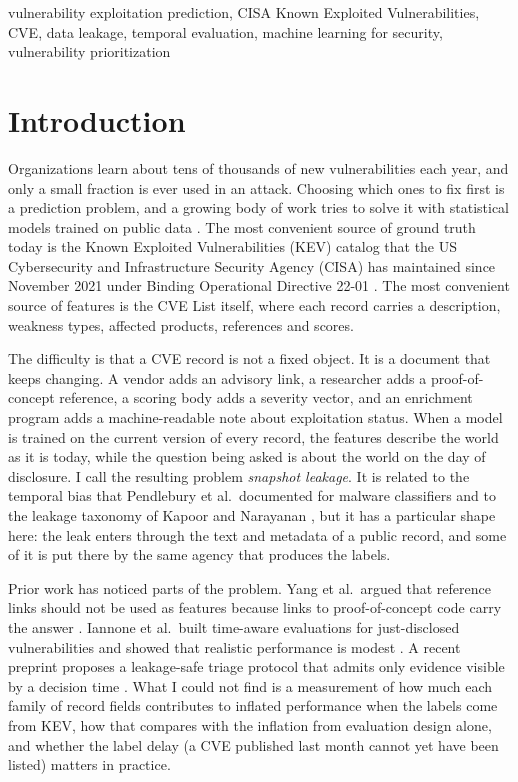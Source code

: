 \documentclass[conference,a4paper]{IEEEtran}
\begin{document}
\begin{IEEEkeywords}vulnerability exploitation prediction, CISA Known Exploited Vulnerabilities, CVE, data leakage, temporal evaluation, machine learning for security, vulnerability prioritization\end{IEEEkeywords}

\section{Introduction}

Organizations learn about tens of thousands of new vulnerabilities each year, and only a small fraction is ever used in an attack. Choosing which ones to fix first is a prediction problem, and a growing body of work tries to solve it with statistical models trained on public data \cite{bozorgi2010,sabottke2015,jacobs2019,suciu2022,jacobs2023}. The most convenient source of ground truth today is the Known Exploited Vulnerabilities (KEV) catalog that the US Cybersecurity and Infrastructure Security Agency (CISA) has maintained since November 2021 under Binding Operational Directive 22-01 \cite{bod2201,kev}. The most convenient source of features is the CVE List itself, where each record carries a description, weakness types, affected products, references and scores.

The difficulty is that a CVE record is not a fixed object. It is a document that keeps changing. A vendor adds an advisory link, a researcher adds a proof-of-concept reference, a scoring body adds a severity vector, and an enrichment program adds a machine-readable note about exploitation status. When a model is trained on the current version of every record, the features describe the world as it is today, while the question being asked is about the world on the day of disclosure. I call the resulting problem \emph{snapshot leakage}. It is related to the temporal bias that Pendlebury et al.\ documented for malware classifiers \cite{pendlebury2019} and to the leakage taxonomy of Kapoor and Narayanan \cite{kapoor2023}, but it has a particular shape here: the leak enters through the text and metadata of a public record, and some of it is put there by the same agency that produces the labels.

Prior work has noticed parts of the problem. Yang et al.\ argued that reference links should not be used as features because links to proof-of-concept code carry the answer \cite{yang2020}. Iannone et al.\ built time-aware evaluations for just-disclosed vulnerabilities and showed that realistic performance is modest \cite{iannone2024}. A recent preprint proposes a leakage-safe triage protocol that admits only evidence visible by a decision time \cite{alpay2026}. What I could not find is a measurement of how much each family of record fields contributes to inflated performance when the labels come from KEV, how that compares with the inflation from evaluation design alone, and whether the label delay (a CVE published last month cannot yet have been listed) matters in practice.
\end{document}
